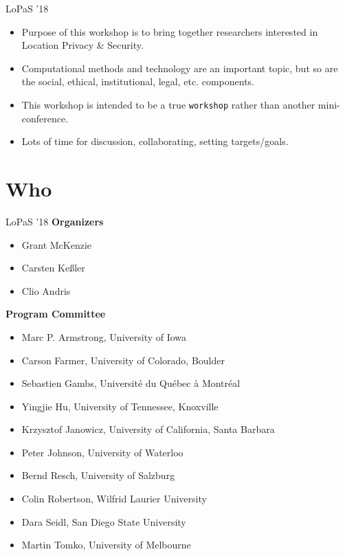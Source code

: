 \documentclass[10pt]{beamer}
\begin{document}
	\begin{frame}{LoPaS '18}
		\begin{itemize}
			\setlength\itemsep{1em}
			\item Purpose of this workshop is to bring together researchers interested in Location Privacy \& Security.
			\item Computational methods and technology are an important topic, but so are the social, ethical, institutional, legal, etc. components.
			\item This workshop is intended to be a true \texttt{workshop} rather than another mini-conference.
			\item Lots of time for discussion, collaborating, setting targets/goals.
		\end{itemize}
	\end{frame}

	\section{Who}

	\begin{frame}{LoPaS '18}
		\textbf{Organizers}
		\begin{itemize}
			\item Grant McKenzie
			\item Carsten Ke{\ss}ler
			\item Clio Andris
		\end{itemize}
		\textbf{Program Committee}
		\begin{itemize}
			\item Marc P. Armstrong, University of Iowa
			\item Carson Farmer, University of Colorado, Boulder
			\item Sebastien Gambs, Université du Québec à Montréal
			\item Yingjie Hu, University of Tennessee, Knoxville
			\item Krzysztof Janowicz, University of California, Santa Barbara
			\item Peter Johnson, University of Waterloo
			\item Bernd Resch, University of Salzburg
			\item Colin Robertson, Wilfrid Laurier University
			\item Dara Seidl, San Diego State University
			\item Martin Tomko, University of Melbourne
		\end{itemize}
	\end{frame}
\end{document}
